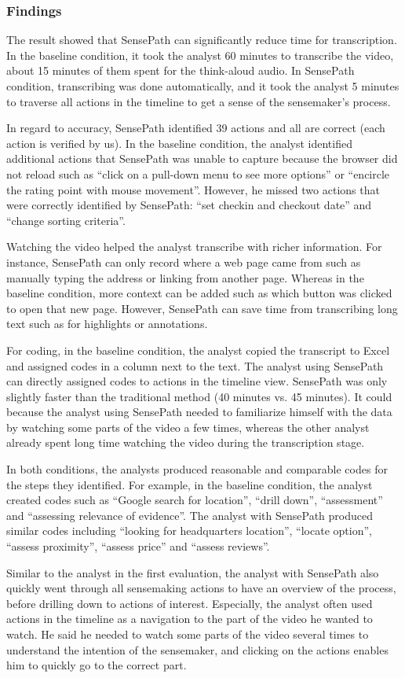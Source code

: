\subsubsection{Findings}
The result showed that SensePath can significantly reduce time for transcription. In the baseline condition, it took the analyst 60 minutes to transcribe the video, about 15 minutes of them spent for the think-aloud audio. In SensePath condition, transcribing was done automatically, and it took the analyst 5 minutes to traverse all actions in the timeline to get a sense of the sensemaker's process.

In regard to accuracy, SensePath identified 39 actions and all are correct (each action is verified by us). In the baseline condition, the analyst identified additional actions that SensePath was unable to capture because the browser did not reload such as ``click on a pull-down menu to see more options'' or ``encircle the rating point with mouse movement''. However, he missed two actions that were correctly identified by SensePath: ``set checkin and checkout date'' and ``change sorting criteria''.

Watching the video helped the analyst transcribe with richer information. For instance, SensePath can only record where a web page came from such as manually typing the address or linking from another page. Whereas in the baseline condition, more context can be added such as which button was clicked to open that new page. However, SensePath can save time from transcribing long text such as for highlights or annotations.

For coding, in the baseline condition, the analyst copied the transcript to Excel and assigned codes in a column next to the text. The analyst using SensePath can directly assigned codes to actions in the timeline view. SensePath was only slightly faster than the traditional method (40 minutes vs. 45 minutes). It could because the analyst using SensePath needed to familiarize himself with the data by watching some parts of the video a few times, whereas the other analyst already spent long time watching the video during the transcription stage.

In both conditions, the analysts produced reasonable and comparable codes for the steps they identified. For example, in the baseline condition, the analyst created codes such as ``Google search for location'', ``drill down'', ``assessment'' and ``assessing relevance of evidence''. The analyst with SensePath produced similar codes including ``looking for headquarters location'', ``locate option'', ``assess proximity'', ``assess price'' and ``assess reviews''.

Similar to the analyst in the first evaluation, the analyst with SensePath also quickly went through all sensemaking actions to have an overview of the process, before drilling down to actions of interest. Especially, the analyst often used actions in the timeline as a navigation to the part of the video he wanted to watch. He said he needed to watch some parts of the video several times to understand the intention of the sensemaker, and clicking on the actions enables him to quickly go to the correct part.